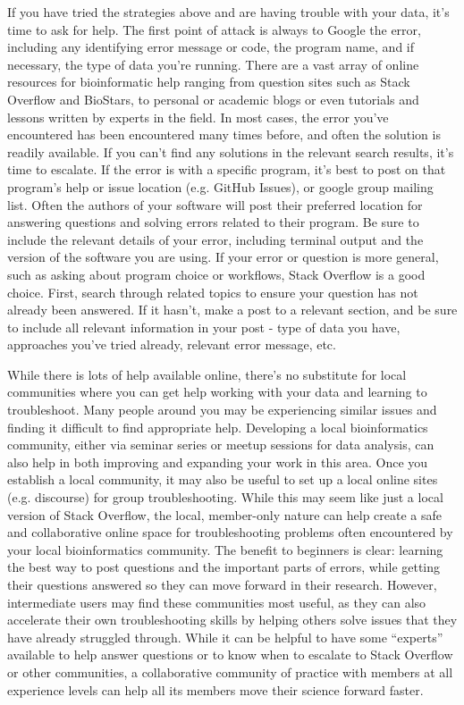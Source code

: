 \documentclass[10pt,letterpaper]{article}
\begin{document}
If you have tried the strategies above and are having trouble with your data, it’s time to ask for help. 
The first point of attack is always to Google the error, including any identifying error message or code, the program name, and if necessary, the type of data you’re running. 
There are a vast array of online resources for bioinformatic help ranging from question sites such as Stack Overflow and BioStars, to personal or academic blogs or even tutorials and lessons written by experts in the field. 
In most cases, the error you’ve encountered has been encountered many times before, and often the solution is readily available. 
If you can’t find any solutions in the relevant search results, it’s time to escalate. 
If the error is with a specific program, it’s best to post on that program’s help or issue location (e.g. GitHub Issues), or google group mailing list. 
Often the authors of your software will post their preferred location for answering questions and solving errors related to their program. 
Be sure to include the relevant details of your error, including terminal output and the version of the software you are using.
 If your error or question is more general, such as asking about program choice or workflows, Stack Overflow is a good choice. 
First, search through related topics to ensure your question has not already been answered. 
If it hasn’t, make a post to a relevant section, and be sure to include all relevant information in your post - type of data you have, approaches you’ve tried already, relevant error message, etc. 

While there is lots of help available online, there’s no substitute for local communities where you can get help working with your data and learning to troubleshoot. 
Many people around you may be experiencing similar issues and finding it difficult to find appropriate help. 
Developing a local bioinformatics community, either via seminar series or meetup sessions for data analysis, can also help in both improving and expanding your work in this area. 
Once you establish a local community, it may also be useful to set up a local online sites (e.g. discourse) for group troubleshooting. 
While this may seem like just a local version of Stack Overflow, the local, member-only nature can help create a safe and collaborative online space for troubleshooting problems often encountered by your local bioinformatics community. 
The benefit to beginners is clear: learning the best way to post questions and the important parts of errors, while getting their questions answered so they can move forward in their research. 
However, intermediate users may find these communities most useful, as they can also accelerate their own troubleshooting skills by helping others solve issues that they have already struggled through. 
While it can be helpful to have some “experts” available to help answer questions or to know when to escalate to Stack Overflow or other communities, a collaborative community of practice with members at all experience levels can help all its members move their science forward faster.
\end{document}
